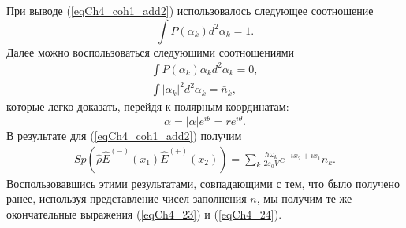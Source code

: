 При выводе (\ref{eqCh4_coh1_add2}) использовалось следующее
соотношение
\[
\int 
P\left(\alpha_{k}\right)
d^2 \alpha_{k} = 1.
\]
Далее можно воспользоваться следующими соотношениями
\begin{eqnarray}
\int P\left(\alpha_k\right)\alpha_k d^2\alpha_k = 0,
\nonumber \\
\int \left|\alpha_k\right|^2 d^2\alpha_k = \bar{n}_k,
\nonumber
\end{eqnarray}
которые легко доказать, перейдя к полярным координатам:
\begin{equation}
\alpha = \left|\alpha\right|e^{i\theta} = r e^{i\theta}.
\nonumber
\end{equation}
В результате для (\ref{eqCh4_coh1_add2}) получим
\begin{eqnarray}
Sp \left(
\hat{\rho}\hat{E}^{(-)}\left(x_1\right)
\hat{E}^{(+)}\left(x_2\right)
\right) = 
\sum_k 
\frac{\hbar\omega_{k}}{2 \varepsilon_0 V}
e^{-i x_2 + i x_1}
\bar{n}_k.
\nonumber
\end{eqnarray}
Воспользовавшись этими результатами, совпадающими с тем, что было
получено ранее, используя представление чисел заполнения $n$, мы
получим те же окончательные выражения (\ref{eqCh4_23}) и
(\ref{eqCh4_24}). 
